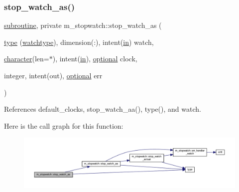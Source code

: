 \subsubsection{\texorpdfstring{stop\+\_\+watch\+\_\+as()}{stop\_watch\_as()}}
{\footnotesize\ttfamily \hyperlink{M__stopwatch_83_8txt_acfbcff50169d691ff02d4a123ed70482}{subroutine}, private m\+\_\+stopwatch\+::stop\+\_\+watch\+\_\+as (\begin{DoxyParamCaption}\item[{\hyperlink{stop__watch_83_8txt_a70f0ead91c32e25323c03265aa302c1c}{type} (\hyperlink{structm__stopwatch_1_1watchtype}{watchtype}), dimension(\+:), intent(\hyperlink{M__journal_83_8txt_afce72651d1eed785a2132bee863b2f38}{in})}]{watch,  }\item[{\hyperlink{option__stopwatch_83_8txt_abd4b21fbbd175834027b5224bfe97e66}{character}(len=$\ast$), intent(\hyperlink{M__journal_83_8txt_afce72651d1eed785a2132bee863b2f38}{in}), \hyperlink{option__stopwatch_83_8txt_aa4ece75e7acf58a4843f70fe18c3ade5}{optional}}]{clock,  }\item[{integer, intent(out), \hyperlink{option__stopwatch_83_8txt_aa4ece75e7acf58a4843f70fe18c3ade5}{optional}}]{err }\end{DoxyParamCaption})\hspace{0.3cm}{\ttfamily [private]}}



References default\+\_\+clocks, stop\+\_\+watch\+\_\+aa(), type(), and watch.

Here is the call graph for this function\+:
\nopagebreak
\begin{figure}[H]
\begin{center}
\leavevmode
\includegraphics[width=350pt]{namespacem__stopwatch_aa9adc6b0a3fa0ccf5c542000f0b7925c_cgraph}
\end{center}
\end{figure}
\mbox{\label{namespacem__stopwatch_a4e078bf14eb68674747cdb6970444f96}} 
